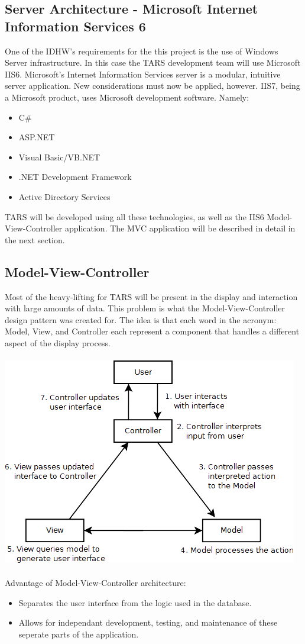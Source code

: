\documentclass[letterpaper]{article}
\begin{document}
\subsection{Server Architecture - Microsoft Internet Information Services 6} 
One of the IDHW's requirements for the this project is the use of Windows Server infrastructure. In this case the TARS development team will use Microsoft IIS6. Microsoft's Internet Information Services server is a modular, intuitive server application. New considerations must now be applied, however. IIS7, being a Microsoft product, uses Microsoft development software. Namely:
\begin{itemize}
\item C\# 
\item ASP.NET
\item Visual Basic/VB.NET
\item .NET Development Framework
\item Active Directory Services
\end{itemize} 
TARS will be developed using all these technologies, as well as the IIS6 Model-View-Controller application. The MVC application will be described in detail in the next section. 

\subsection{Model-View-Controller}
Most of the heavy-lifting for TARS will be present in the display and interaction with large amounts of data. This problem is what the Model-View-Controller design pattern was created for. The idea is that each word in the acronym: Model, View, and Controller each represent a component that handles a different aspect of the display process.\\
\\

\includegraphics[scale=0.6]{mvc.png}\\
\\
Advantage of Model-View-Controller architecture:
\begin{itemize}
\item Separates the user interface from the logic used in the database.
\item Allows for independant development, testing, and maintenance of these seperate parts of the application.
\end{itemize}
\end{document}
